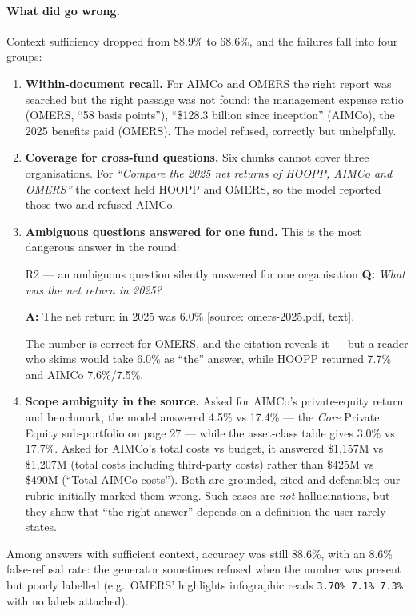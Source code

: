 \documentclass[11pt,a4paper]{article}
\newcommand{\Q}[1]{\noindent\textbf{Q:} \textit{#1}\par\smallskip}
\newcommand{\A}[1]{\noindent\textbf{A:} {\small\ttfamily #1}\par}
\begin{document}
\paragraph{What did go wrong.} Context sufficiency dropped from 88.9\% to 68.6\%, and the failures fall into four
groups:
\begin{enumerate}
  \item \textbf{Within-document recall.} For AIMCo and OMERS the right report was searched but the right passage
        was not found: the management expense ratio (OMERS, ``58 basis points''), ``\$128.3 billion since
        inception'' (AIMCo), the 2025 benefits paid (OMERS). The model refused, correctly but unhelpfully.
  \item \textbf{Coverage for cross-fund questions.} Six chunks cannot cover three organisations. For
        \emph{``Compare the 2025 net returns of HOOPP, AIMCo and OMERS''} the context held HOOPP and OMERS, so the
        model reported those two and refused AIMCo.
  \item \textbf{Ambiguous questions answered for one fund.} This is the most dangerous answer in the round:
\begin{qa}{R2 --- an ambiguous question silently answered for one organisation}
\Q{What was the net return in 2025?}
\A{The net return in 2025 was 6.0\% [source: omers-2025.pdf, text].}
\end{qa}
        The number is correct for OMERS, and the citation reveals it --- but a reader who skims would take 6.0\% as
        ``the'' answer, while HOOPP returned 7.7\% and AIMCo 7.6\%/7.5\%.
  \item \textbf{Scope ambiguity in the source.} Asked for AIMCo's private-equity return and benchmark, the model
        answered 4.5\% vs 17.4\% --- the \emph{Core} Private Equity sub-portfolio on page 27 --- while the
        asset-class table gives 3.0\% vs 17.7\%. Asked for AIMCo's total costs vs budget, it answered \$1,157M vs
        \$1,207M (total costs including third-party costs) rather than \$425M vs \$490M (``Total AIMCo costs'').
        Both are grounded, cited and defensible; our rubric initially marked them wrong. Such cases are
        \emph{not} hallucinations, but they show that ``the right answer'' depends on a definition the user
        rarely states.
\end{enumerate}
Among answers with sufficient context, accuracy was still 88.6\%, with an 8.6\% false-refusal rate: the generator
sometimes refused when the number was present but poorly labelled (e.g.\ OMERS' highlights infographic reads
\texttt{3.70\% 7.1\% 7.3\%} with no labels attached).
\end{document}
